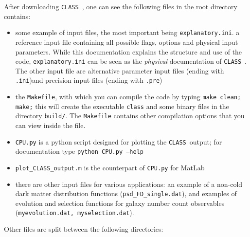 \documentclass{article}
\newcommand\CLASS{{\tt CLASS}~}
\begin{document}
After downloading \CLASS, one can see the following files in
the root directory contains:
\begin{itemize}
\item some example of input files, the most important being {\tt explanatory.ini}. a reference input file containing all possible flags, options and physical input parameters. While this documentation explains the structure and use of the code, {\tt explanatory.ini} can be seen as the {\it physical} documentation of \CLASS.
The other input file are alternative parameter input files (ending with {\tt .ini})and precision input files (ending with {\tt .pre})
\item 
the {\tt Makefile},  with which you can compile the code by typing {\tt make clean; make;} this will create the executable {\tt class} and some binary files in the directory {\tt build/}. The {\tt Makefile} contains other compilation options that you can view inside the file.
\item {\tt CPU.py} is a python script designed for plotting the \CLASS output; for documentation type {\tt python CPU.py --help}
\item {\tt plot\_CLASS\_output.m} is the counterpart of {\tt CPU.py} for MatLab
\item there are other input files for various applications: an example of a non-cold dark matter distribution functions ({\tt psd\_FD\_single.dat}), and examples of evolution and selection functions for galaxy number count observables ({\tt myevolution.dat, myselection.dat}).
\end{itemize}
Other files are split between the
following directories:
\end{document}
